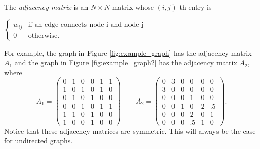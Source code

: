 \begin{definition} The \emph{adjacency matrix} is an $N \times N$ matrix whose $(i,j)$-th entry is
\begin{center}
	$ \begin{cases}  w_{ij} & \mbox{if an edge connects node i and node j} \\ 0 & \mbox{otherwise.} \end{cases}$
\end{center}
\end{definition}

For example, the graph in Figure \ref{fig:example_graph} has the adjacency matrix $A_1$ and the graph in Figure \ref{fig:example_graph2} has the adjacency matrix $A_2$, where
\[
A_1 = \begin{pmatrix}
0 & 1 & 0 & 0 & 1 & 1\\
1 & 0 & 1 & 0 & 1 & 0\\
0 & 1 & 0 & 1 & 0 & 0\\
0 & 0 & 1 & 0 & 1 & 1\\
1 & 1 & 0 & 1 & 0 & 0\\
1 & 0 & 0 & 1 & 0 & 0
\end{pmatrix} \qquad A_2 = 
 \begin{pmatrix}
0 & 3 & 0 & 0 & 0 & 0\\
3 & 0 & 0 & 0 & 0 & 0\\
0 & 0 & 0 & 1 & 0 & 0\\
0 & 0 & 1 & 0 & 2 & .5\\
0 & 0 & 0 & 2 & 0 & 1\\
0 & 0 & 0 & .5 & 1 & 0
\end{pmatrix}.
\]
Notice that these adjacency matrices are symmetric. This will always be the case for undirected graphs.

